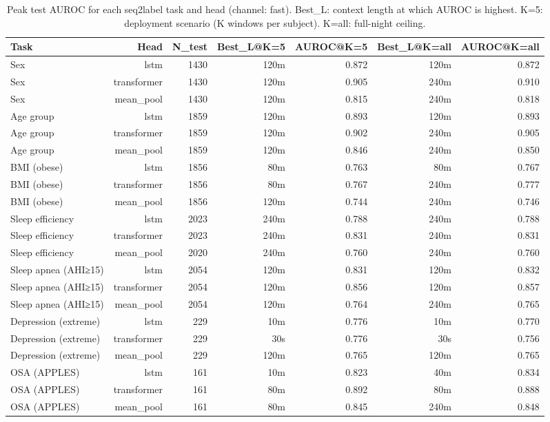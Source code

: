 \begin{table}[ht]
\centering
\caption{Peak test AUROC for each seq2label task and head (channel: fast). Best\_L: context length at which AUROC is highest. K=5: deployment scenario (K windows per subject). K=all: full-night ceiling.}
\label{tab:peak_auroc_fast}
\begin{tabular}{lrrrrrr}
\toprule
Task & Head & N_test & Best_L@K=5 & AUROC@K=5 & Best_L@K=all & AUROC@K=all \\
\midrule
Sex & lstm & 1430 & 120m & 0.872 & 120m & 0.872 \\
Sex & transformer & 1430 & 120m & 0.905 & 240m & 0.910 \\
Sex & mean_pool & 1430 & 120m & 0.815 & 240m & 0.818 \\
Age group & lstm & 1859 & 120m & 0.893 & 120m & 0.893 \\
Age group & transformer & 1859 & 120m & 0.902 & 240m & 0.905 \\
Age group & mean_pool & 1859 & 120m & 0.846 & 240m & 0.850 \\
BMI (obese) & lstm & 1856 & 80m & 0.763 & 80m & 0.767 \\
BMI (obese) & transformer & 1856 & 80m & 0.767 & 240m & 0.777 \\
BMI (obese) & mean_pool & 1856 & 120m & 0.744 & 240m & 0.746 \\
Sleep efficiency & lstm & 2023 & 240m & 0.788 & 240m & 0.788 \\
Sleep efficiency & transformer & 2023 & 240m & 0.831 & 240m & 0.831 \\
Sleep efficiency & mean_pool & 2020 & 240m & 0.760 & 240m & 0.760 \\
Sleep apnea (AHI≥15) & lstm & 2054 & 120m & 0.831 & 120m & 0.832 \\
Sleep apnea (AHI≥15) & transformer & 2054 & 120m & 0.856 & 120m & 0.857 \\
Sleep apnea (AHI≥15) & mean_pool & 2054 & 120m & 0.764 & 240m & 0.765 \\
Depression (extreme) & lstm & 229 & 10m & 0.776 & 10m & 0.770 \\
Depression (extreme) & transformer & 229 & 30s & 0.776 & 30s & 0.756 \\
Depression (extreme) & mean_pool & 229 & 120m & 0.765 & 120m & 0.765 \\
OSA (APPLES) & lstm & 161 & 10m & 0.823 & 40m & 0.834 \\
OSA (APPLES) & transformer & 161 & 80m & 0.892 & 80m & 0.888 \\
OSA (APPLES) & mean_pool & 161 & 80m & 0.845 & 240m & 0.848 \\
\bottomrule
\end{tabular}
\end{table}